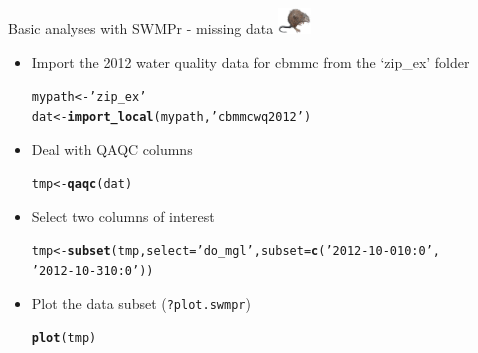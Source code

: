 \documentclass[xcolor=dvipsnames,serif]{beamer}\usepackage[]{graphicx}\usepackage[]{color}
\makeatletter
\newcommand{\hlstr}[1]{\textcolor[rgb]{0.192,0.494,0.8}{#1}}%
\newcommand{\hlstd}[1]{\textcolor[rgb]{0.345,0.345,0.345}{#1}}%
\newcommand{\hlkwb}[1]{\textcolor[rgb]{0.69,0.353,0.396}{#1}}%
\newcommand{\hlkwc}[1]{\textcolor[rgb]{0.333,0.667,0.333}{#1}}%
\newcommand{\hlkwd}[1]{\textcolor[rgb]{0.737,0.353,0.396}{\textbf{#1}}}%
\newenvironment{kframe}{%
 \def\at@end@of@kframe{}%
 \ifinner\ifhmode%
  \def\at@end@of@kframe{\end{minipage}}%
  \begin{minipage}{\columnwidth}%
 \fi\fi%
 \def\FrameCommand##1{\hskip\@totalleftmargin \hskip-\fboxsep
 \colorbox{shadecolor}{##1}\hskip-\fboxsep
     \hskip-\linewidth \hskip-\@totalleftmargin \hskip\columnwidth}%
 \MakeFramed {\advance\hsize-\width
   \@totalleftmargin\z@ \linewidth\hsize
   \@setminipage}}%
 {\par\unskip\endMakeFramed%
 \at@end@of@kframe}
\newenvironment{knitrout}{}{} %
\makeatother
\begin{document}
\begin{frame}[fragile]{Basic analyses with SWMPr - missing data \includegraphics[width = 0.065\textwidth]{imgs/swmprat.png}}
\begin{itemize}
\item {}
Import the 2012 water quality data for cbmmc from the `zip\_ex' folder
\begin{knitrout}\scriptsize
{}\color{fgcolor}\begin{kframe}
\begin{alltt}
\hlstd{mypath} \hlkwb{<-} \hlstr{'zip_ex'}
\hlstd{dat} \hlkwb{<-} \hlkwd{import_local}\hlstd{(mypath,} \hlstr{'cbmmcwq2012'}\hlstd{)}
\end{alltt}
\end{kframe}
\end{knitrout}
\vspace{0.1in}
\item {}
Deal with QAQC columns
\begin{knitrout}\scriptsize
{}\color{fgcolor}\begin{kframe}
\begin{alltt}
\hlstd{tmp} \hlkwb{<-} \hlkwd{qaqc}\hlstd{(dat)}
\end{alltt}
\end{kframe}
\end{knitrout}
\vspace{0.1in}
\item {}
Select two columns of interest
\begin{knitrout}\scriptsize
{}\color{fgcolor}\begin{kframe}
\begin{alltt}
\hlstd{tmp} \hlkwb{<-} \hlkwd{subset}\hlstd{(tmp,} \hlkwc{select} \hlstd{=} \hlstr{'do_mgl'}\hlstd{,} \hlkwc{subset} \hlstd{=} \hlkwd{c}\hlstd{(}\hlstr{'2012-10-01 0:0'}\hlstd{,}
  \hlstr{'2012-10-31 0:0'}\hlstd{))}
\end{alltt}
\end{kframe}
\end{knitrout}
\vspace{0.1in}
\item {}
Plot the data subset (\texttt{?plot.swmpr})
\begin{knitrout}\scriptsize
{}\color{fgcolor}\begin{kframe}
\begin{alltt}
\hlkwd{plot}\hlstd{(tmp)}
\end{alltt}
\end{kframe}
\end{knitrout}
\end{itemize}
\end{frame}
\end{document}
